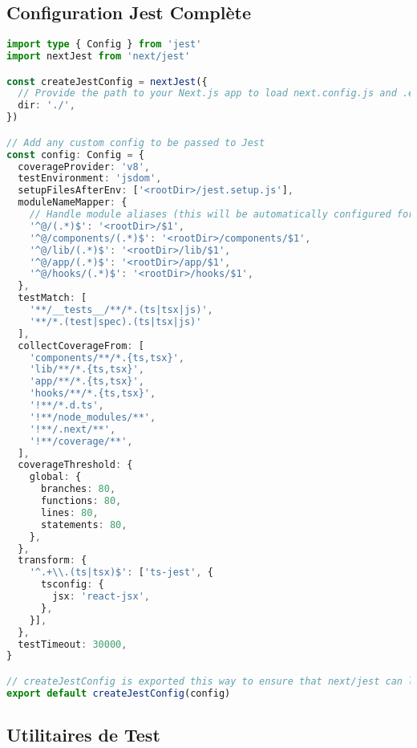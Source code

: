 \subsection{Configuration Jest Complète}

\begin{lstlisting}[language=TypeScript, caption=jest.config.ts]
import type { Config } from 'jest'
import nextJest from 'next/jest'

const createJestConfig = nextJest({
  // Provide the path to your Next.js app to load next.config.js and .env files
  dir: './',
})

// Add any custom config to be passed to Jest
const config: Config = {
  coverageProvider: 'v8',
  testEnvironment: 'jsdom',
  setupFilesAfterEnv: ['<rootDir>/jest.setup.js'],
  moduleNameMapper: {
    // Handle module aliases (this will be automatically configured for you based on your tsconfig.json paths)
    '^@/(.*)$': '<rootDir>/$1',
    '^@/components/(.*)$': '<rootDir>/components/$1',
    '^@/lib/(.*)$': '<rootDir>/lib/$1',
    '^@/app/(.*)$': '<rootDir>/app/$1',
    '^@/hooks/(.*)$': '<rootDir>/hooks/$1',
  },
  testMatch: [
    '**/__tests__/**/*.(ts|tsx|js)',
    '**/*.(test|spec).(ts|tsx|js)'
  ],
  collectCoverageFrom: [
    'components/**/*.{ts,tsx}',
    'lib/**/*.{ts,tsx}',
    'app/**/*.{ts,tsx}',
    'hooks/**/*.{ts,tsx}',
    '!**/*.d.ts',
    '!**/node_modules/**',
    '!**/.next/**',
    '!**/coverage/**',
  ],
  coverageThreshold: {
    global: {
      branches: 80,
      functions: 80,
      lines: 80,
      statements: 80,
    },
  },
  transform: {
    '^.+\\.(ts|tsx)$': ['ts-jest', {
      tsconfig: {
        jsx: 'react-jsx',
      },
    }],
  },
  testTimeout: 30000,
}

// createJestConfig is exported this way to ensure that next/jest can load the Next.js config which is async
export default createJestConfig(config)
\end{lstlisting}

\subsection{Utilitaires de Test}

